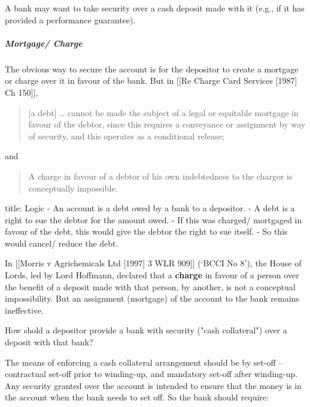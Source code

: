 \documentclass[
]{article}
\newenvironment{Shaded}{}{}
\newcommand{\NormalTok}[1]{#1}
\begin{document}
A bank may want to take security over a cash deposit made with it (e.g.,
if it has provided a performance guarantee).

\hypertarget{mortgage-charge}{%
\subparagraph{Mortgage/ Charge}\label{mortgage-charge}}

The obvious way to secure the account is for the depositor to create a
mortgage or charge over it in favour of the bank. But in {[}{[}Re Charge
Card Services {[}1987{]} Ch 150{]}{]},

\begin{quote}
{[}a debt{]} \ldots{} cannot be made the subject of a legal or equitable
mortgage in favour of the debtor, since this requires a conveyance or
assignment by way of security, and this operates as a conditional
release;
\end{quote}

and

\begin{quote}
A charge in favour of a debtor of his own indebtedness to the chargor is
conceptually impossible.
\end{quote}

\begin{Shaded}
\begin{Highlighting}[]
\NormalTok{title: Logic}
\NormalTok{{-} An account is a debt owed by a bank to a depositor. }
\NormalTok{{-} A debt is a right to sue the debtor for the amount owed. }
\NormalTok{{-} If this was charged/ mortgaged in favour of the debt, this would give the debtor the right to sue itself. }
\NormalTok{{-} So this would cancel/ reduce the debt. }
\end{Highlighting}
\end{Shaded}

In {[}{[}Morris v Agrichemicals Ltd {[}1997{]} 3 WLR 909{]}{]} (`BCCI No
8'), the House of Lords, led by Lord Hoffmann, declared that a
\textbf{charge} in favour of a person over the benefit of a deposit made
with that person, by another, is not a conceptual impossibility. But an
assignment (mortgage) of the account to the bank remains ineffective.

\begin{Shaded}
\begin{Highlighting}[]
\NormalTok{How shold a depositor provide a bank with security ("cash collateral") over a deposit with that bank?}
\end{Highlighting}
\end{Shaded}

The means of enforcing a cash collateral arrangement should be by
set-off -- contractual set-off prior to winding-up, and mandatory
set-off after winding-up. Any security granted over the account is
intended to ensure that the money is in the account when the bank needs
to set off. So the bank should require:
\end{document}
